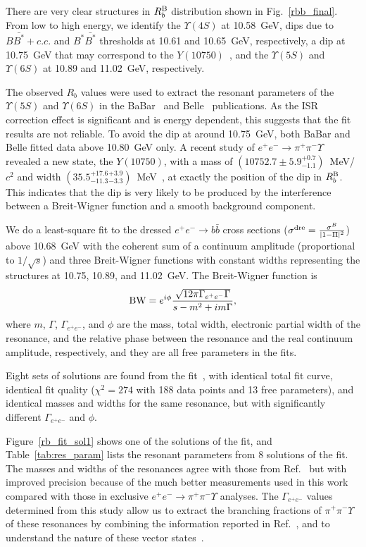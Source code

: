 \documentclass[aps,showpacs,superscriptaddress,preprint,tightenlines]{revtex4}
\newcommand{\Rb}{R_b}
\newcommand{\RbB}{R_b^{\rm B}}
\newcommand{\pp}{\pi^+\pi^-}
\newcommand{\EE}{e^+e^-}
\newcommand{\bbb}{b\bar{b}}
\begin{document}
There are very clear structures in $\RbB$ distribution shown in 
Fig.~\ref{rbb_final}. From low to high energy, we identify
the $\Upsilon(4S)$ at 10.58~GeV, dips due to
$B\bar{B^*}+c.c.$ and $B^*\bar{B^*}$ thresholds at 
10.61 and 10.65~GeV, respectively, a dip at 10.75~GeV
that may correspond to the $Y(10750)$~\cite{Y10750},
and the $\Upsilon(5S)$ and $\Upsilon(6S)$ at 10.89
and 11.02~GeV, respectively.

The observed $\Rb$ values were used to extract the resonant
parameters of the $\Upsilon(5S)$ and $\Upsilon(6S)$ in the
BaBar~\cite{babar_rb} and Belle~\cite{belle_rb} publications. As
the ISR correction effect is significant and is energy dependent,
this suggests that the fit results are not reliable.
To avoid the dip at around 10.75~GeV, both BaBar and Belle fitted 
data above 10.80~GeV only. A recent study of $\EE\to \pp\Upsilon$
revealed a new state, the $Y(10750)$, with a mass of 
$(10752.7\pm 5.9^{+0.7}_{-1.1})$~MeV/$c^2$ and width 
$(35.5^{+17.6}_{-11.3}{}^{+3.9}_{-3.3})$~MeV~\cite{Y10750}, at 
exactly the position of the dip in $\RbB$. This indicates that
the dip is very likely to be produced by the interference between a 
Breit-Wigner function and a smooth background component.

We do a least-square fit to the dressed $\EE\to \bbb$ cross sections 
($\sigma^{\rm dre}=\frac{\sigma^B}{|1-\Pi|^2}$) above 10.68~GeV
with the coherent sum of a continuum amplitude (proportional to $1/\sqrt{s}$)
and three Breit-Wigner functions with constant widths representing the
structures at 10.75, 10.89, and 11.02~GeV. The Breit-Wigner function is
$$
{\rm BW}=e^{i\phi}\frac{\sqrt{12\pi\Gamma_{\EE}\Gamma}}{s-m^2+im\Gamma},
$$
where $m$, $\Gamma$, $\Gamma_{\EE}$, and $\phi$ are the mass, total width,
electronic partial width of the resonance, and the relative
phase between the resonance and the real continuum amplitude, respectively, 
and they are all free parameters in the fits.

Eight sets of solutions are found from the fit~\cite{zhuk}, 
with identical total fit curve, identical fit quality
($\chi^2=274$ with 188 data points and 13 free parameters), and identical 
masses and widths for the same resonance, but with significantly different 
$\Gamma_{\EE}$ and $\phi$.

Figure~\ref{rb_fit_sol1} shows one of the solutions of the fit, and
Table~\ref{tab:res_param} lists the resonant parameters from 
8 solutions of the fit. The masses and widths of the resonances 
agree with those from Ref.~\cite{Y10750} but with improved precision
because of the much better measurements used in this work compared
with those in exclusive $\EE\to \pp\Upsilon$ analyses. The $\Gamma_{\EE}$
values determined from this study allow us to extract the branching fractions of
$\pp\Upsilon$ of these resonances by combining the information reported
in Ref.~\cite{Y10750}, and to understand the nature of these vector 
states~\cite{zhangal,maiani,zhongxh,wangzg,liangwh}.
\end{document}

